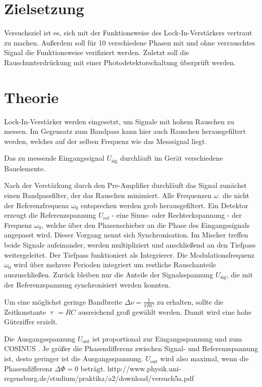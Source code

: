 \section{Zielsetzung}

Versuchsziel ist es, sich mit der Funktionsweise des Lock-In-Verstärkers vertraut zu machen. Außerdem soll für 10 verschiedene Phasen mit und ohne verrauschtes Signal die Funktionsweise verifiziert werden. Zuletzt soll die Rauschunterdrückung mit einer Photodetektorschaltung überprüft werden.

\section{Theorie}
\label{sec:Theorie}

Lock-In-Verstärker werden eingesetzt, um Signale mit hohem Rauschen zu messen. 
Im Gegensatz zum Bandpass kann hier auch Rauschen herausgefiltert werden, welches auf der selben Frequenz wie das Messsignal liegt.

Das zu messende Eingangssignal $U_\mathup{sig}$ durchläuft im Gerät verschiedene Bauelemente.

Nach der Verstärkung durch den Pre-Amplifier durchläuft das Signal zunächst einen Bandpassfilter, der das Rauschen minimiert. 
Alle Frequenzen $\omega$. die nicht der Referenzfrequenz $\omega_0$ entsprechen werden grob herausgefiltert.
Ein Detektor erzeugt die Referenzspannung $U_\mathup{ref}$ - eine Sinus- oder Rechteckspannung - der Frequenz $\omega_0$, welche über den Phasenschieber an die Phase des Eingangssignals angepasst wird. 
Dieser Vorgang nennt sich Synchronisation.
Im Mischer treffen beide Signale aufeinander, werden multipliziert und anschließend an den Tiefpass weitergeleitet.
Der Tiefpass funktioniert als Integrierer. 
Die Modulationsfrequenz $\omega_0$ wird über mehrere Perioden integriert um restliche Rauschanteile auszuschließen. Zurück bleiben nur die Anteile der Signalsspannung $U_\mathup{sig}$, die mit der Referenzspannung synchronisiert werden konnten.

Um eine möglichst geringe Bandbreite $\Delta{\nu}=\frac{1}{\pi RC}$ zu erhalten, sollte die Zeitkonstante $\uptau=RC$ ausreichend groß gewählt werden. Damit wird eine hohe Güteziffer erzielt.

Die Ausgangsspannung $U_\mathup{out}$ ist proportional zur Eingangsspannung und zum COSINUS . Je größer die Phasendifferenz zwischen Signal- und Referenzspannung ist, desto geringer ist die Ausgangsspannung. $U_\mathup{out}$ wird also maximal, wenn die Phasendifferenz $\Delta\Phi=0$ beträgt.
http://www.physik.uni-regensburg.de/studium/praktika/a2/download/versuch5a.pdf




